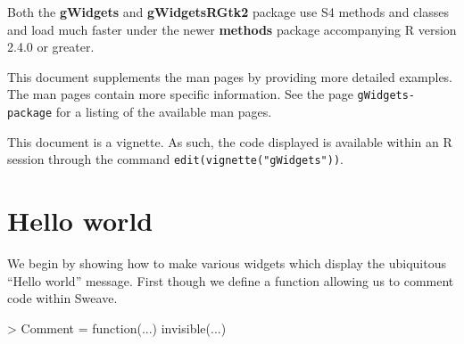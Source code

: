 \documentclass[12pt]{article}
\newcommand{\RCode}[1]{\texttt{#1}}
\newcommand{\RPackage}[1]{\textbf{#1}}
\begin{document}
Both the \RPackage{gWidgets} and \RPackage{gWidgetsRGtk2} package use
S4 methods and classes and load much faster under the newer
\RPackage{methods} package accompanying R version 2.4.0 or greater.

This document supplements the man pages by providing more detailed
examples. The man pages contain more specific information. See the 
page \RCode{gWidgets-package} for a listing of the available man pages.

This document is a vignette. As such, the code displayed is available
within an R session through the command
\RCode{edit(vignette("gWidgets"))}. 

\section{Hello world}

We begin by showing how to make various widgets which display the
ubiquitous ``Hello world'' message. First though we define a function
allowing us to comment code within Sweave.
\begin{Schunk}
\begin{Sinput}
> Comment = function(...) invisible(...)
\end{Sinput}
\end{Schunk}
\end{document}
